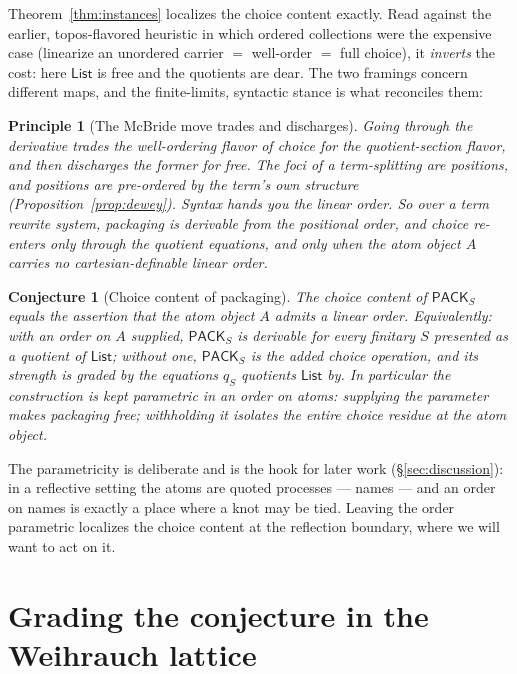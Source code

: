 \documentclass[11pt]{article}
\theoremstyle{definition}
\theoremstyle{plain}
\newtheorem{conjecture}[definition]{Conjecture}
\newtheorem{principle}[definition]{Principle}
\newcommand{\Coll}{S}
\newcommand{\List}{\mathsf{List}}
\newcommand{\Pack}{\mathsf{PACK}}
\newcommand{\qmap}{q}
\begin{document}
Theorem~\ref{thm:instances} localizes the choice content exactly. Read
against the earlier, topos-flavored heuristic in which ordered collections
were the expensive case (linearize an unordered carrier $=$ well-order $=$
full choice), it \emph{inverts} the cost: here $\List$ is free and the
quotients are dear. The two framings concern different maps, and the
finite-limits, syntactic stance is what reconciles them:

\begin{principle}[The McBride move trades and discharges]
\label{prin:trade}
Going through the derivative trades the \emph{well-ordering flavor} of choice
for the \emph{quotient-section flavor}, and then discharges the former for
free. The foci of a term-splitting are \emph{positions}, and positions are
pre-ordered by the term's own structure (Proposition~\ref{prop:dewey}). Syntax
hands you the linear order. So over a term rewrite system, packaging is
derivable from the positional order, and choice re-enters only through the
quotient equations, and only when the atom object $A$ carries no
cartesian-definable linear order.
\end{principle}

\begin{conjecture}[Choice content of packaging]
\label{conj:main}
The choice content of $\Pack_{\Coll}$ equals the assertion that the atom
object $A$ admits a linear order. Equivalently: with an order on $A$ supplied,
$\Pack_{\Coll}$ is derivable for every finitary $\Coll$ presented as a quotient
of $\List$; without one, $\Pack_{\Coll}$ is the added choice operation, and its
strength is graded by the equations $\qmap_{\Coll}$ quotients $\List$ by. In
particular the construction is kept \emph{parametric in an order on atoms}:
supplying the parameter makes packaging free; withholding it isolates the
entire choice residue at the atom object.
\end{conjecture}

The parametricity is deliberate and is the hook for later work
(\S\ref{sec:discussion}): in a reflective setting the atoms are quoted
processes --- names --- and an order on names is exactly a place where a knot
may be tied. Leaving the order parametric localizes the choice content at the
reflection boundary, where we will want to act on it.

\section{Grading the conjecture in the Weihrauch lattice}
\label{sec:grading}
\end{document}

